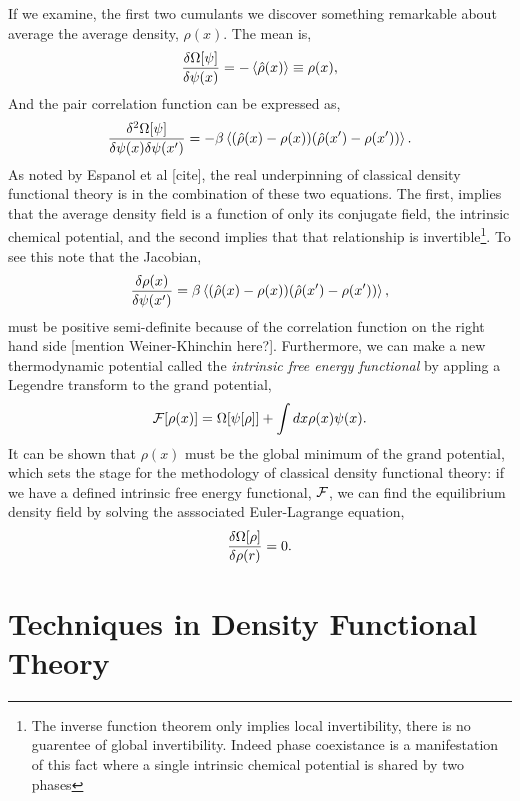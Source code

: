 If we examine, the first two cumulants we discover something remarkable about
average the average density, $\rho(x)$. The mean is,
%
\begin{equation}
    \frac{\delta \Omega[\psi]}{\delta \psi(x)} = -\left\langle \hat{\rho}(x) \right\rangle \equiv \rho(x),
\end{equation}
%
And the pair correlation function can be expressed as, 
%
\begin{equation}
    \frac{\delta^2 \Omega[\psi]}{\delta \psi(x) \delta \psi(x^\prime)}
        = - \beta\left\langle (\hat{\rho}(x) - \rho(x))(\hat{\rho}(x^\prime) - \rho(x^\prime)) \right\rangle.
\end{equation}
%
As noted by Espanol et al [cite], the real underpinning of classical density
functional theory is in the combination of these two equations.  The first,
implies that the average density field is a function of only its conjugate
field, the intrinsic chemical potential, and the second implies that that
relationship is invertible\footnote{The inverse function theorem only implies
local invertibility, there is no guarentee of global invertibility. Indeed
phase coexistance is a manifestation of this fact where a single intrinsic
chemical potential is shared by two phases}.  To see this note that the
Jacobian, 
%
\begin{equation}
    \frac{\delta \rho(x)}{\delta \psi(x^\prime)} 
        = \beta \left\langle (\hat{\rho}(x) - \rho(x))(\hat{\rho}(x^\prime) - \rho(x^\prime)) \right\rangle,
\end{equation}
%
must be positive semi-definite because of the correlation function on the right
hand side [mention Weiner-Khinchin here?]. Furthermore, we can make a new
thermodynamic potential called the \textit{intrinsic free energy functional} by
appling a Legendre transform to the grand potential,
%
\begin{equation}
    \mathcal{F}[\rho(x)] = \Omega[\psi[\rho]] + \int dx \rho(x) \psi(x).
\end{equation}
%
It can be shown \cite{HansenAppendixB} that $\rho(x)$ must be the global
minimum of the grand potential, which sets the stage for the methodology of
classical density functional theory: if we have a defined intrinsic free energy
functional, $\mathcal{F}$, we can find the equilibrium density field by solving the
asssociated Euler-Lagrange equation, 
%
\begin{equation}
    \frac{\delta \Omega[\rho]}{\delta \rho(r)} = 0.
\end{equation}

\section{Techniques in Density Functional Theory} %

